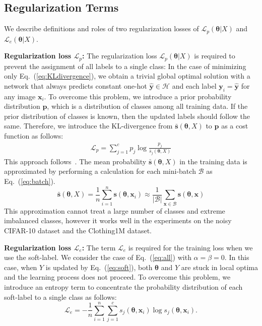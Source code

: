 \documentclass[10pt,twocolumn,letterpaper]{article}
\newcommand{\Eref}[1]{Eq.~(\ref{#1})}
\begin{document}
\addtolength\textfloatsep{5mm}
\subsection{Regularization Terms}\label{sec:regterm}
We describe definitions and roles of two regularization losses of $\mathcal{L}_p(\bm{\theta}|X)$ and $\mathcal{L}_e(\bm{\theta}|X)$.

\vspace{2mm}\noindent\textbf{Regularization loss $\mathcal{L}_p$:}
The regularization loss $\mathcal{L}_p(\bm{\theta}|X)$ is required to prevent the assignment of all labels to a single class: In the case of minimizing only \Eref{eq:KLdivergence}, we obtain a trivial global optimal solution with a network that always predicts constant one-hot $\hat{\bm{y}}\in\mathcal{H}$ and each label $\bm{y}_i=\hat{\bm{y}}$ for any image $\bm{x}_i$.
To overcome this problem, we introduce a prior probability distribution $\bm{p}$, which is a distribution of classes among all training data. If the prior distribution of classes is known, then the updated labels should follow the same. Therefore, we introduce the KL-divergence from $\bar{\bm{s}}(\bm{\theta},X)$ to $\bm{p}$ as a cost function as follows:
\begin{equation}\label{eq:kl}
\begin{split}
\mathcal{L}_{p}=\sum_{j=1}^cp_j\log\frac{p_j}{\bar{s}_j(\bm{\theta},X)}
\end{split}
\end{equation}
This approach follows~\cite{hu2017learning}. The mean probability $\bar{\bm{s}}(\bm{\theta},X)$ in the training data is approximated by performing a calculation for each mini-batch $\mathcal{B}$ as \Eref{eq:batch}.
\begin{equation}\label{eq:batch}
\bar{\bm{s}}(\bm{\theta},X)
=\frac{1}{n}\sum_{i=1}^n\bm{s}(\bm{\theta},\bm{x}_i)\approx\frac{1}{|\mathcal{B}|}\sum_{\bm{x}\in\mathcal{B}}\bm{s}(\bm{\theta},\bm{x})
\end{equation}
This approximation cannot treat a large number of classes and extreme imbalanced classes, however it works well in the experiments on the noisy CIFAR-10 dataset and the Clothing1M dataset.

\vspace{2mm}\noindent\textbf{Regularization loss $\mathcal{L}_e$:}
The term $\mathcal{L}_e$ is required for the training loss when we use the soft-label. We consider the case of \Eref{eq:all} with $\alpha=\beta=0$. In this case, when $Y$ is updated by \Eref{eq:soft}, both $\bm{\theta}$ and $Y$ are stuck in local optima and the learning process does not proceed. To overcome this problem, we introduce an entropy term to concentrate the probability distribution of each soft-label to a single class as follows:
\begin{equation}\label{eq:ent}
\mathcal{L}_{e} = -\frac{1}{n}\sum_{i=1}^n\sum_{j=1}^cs_j(\bm{\theta},\bm{x}_i)\log s_j(\bm{\theta},\bm{x}_i).
\end{equation}
\end{document}
